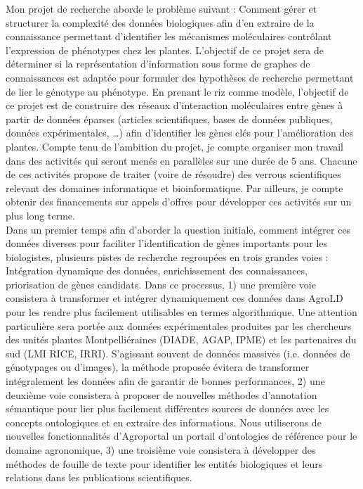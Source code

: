 Mon projet de recherche aborde le problème suivant : Comment gérer et structurer la complexité des données biologiques afin d’en extraire de la connaissance permettant d’identifier les mécanismes moléculaires contrôlant l’expression de phénotypes chez les plantes. 
L’objectif de ce projet sera de déterminer si la représentation d’information sous forme de graphes de connaissances est adaptée pour formuler des hypothèses de recherche permettant de lier le génotype au phénotype. En prenant le riz comme modèle, l’objectif de ce projet est de construire des réseaux d’interaction moléculaires entre gènes à partir de données éparses (articles scientifiques, bases de données publiques, données expérimentales, …) afin d’identifier les gènes clés pour l’amélioration des plantes. Compte tenu de l’ambition du projet, je compte organiser mon travail dans des activités qui seront menés en parallèles sur une durée de 5 ans. Chacune de ces activités propose de traiter (voire de résoudre) des verrous scientifiques relevant des domaines informatique et bioinformatique. Par ailleurs, je compte obtenir des financements sur appels d’offres pour développer ces activités sur un plus long terme. \\

Dans un premier temps afin d'aborder la question initiale, comment intégrer ces données diverses pour faciliter l’identification de gènes importants pour les biologistes,  plusieurs pistes de recherche regroupées en trois grandes voies : Intégration dynamique des données, enrichissement des connaissances, priorisation de gènes candidats. Dans ce processus, 1) une première voie consistera à transformer et intégrer dynamiquement ces données dans AgroLD pour les rendre plus facilement utilisables en termes algorithmique. Une attention particulière sera portée aux données expérimentales produites par les chercheurs des unités plantes Montpelliéraines (DIADE, AGAP, IPME) et les partenaires du sud (LMI RICE, IRRI). S’agissant souvent de données massives (i.e. données de génotypages ou d’images), la méthode proposée évitera de transformer intégralement les données afin de garantir de bonnes performances, 2) une deuxième voie consistera à proposer de nouvelles méthodes d’annotation sémantique pour lier plus facilement différentes sources de données avec les concepts ontologiques et en extraire des informations. Nous utiliserons de nouvelles fonctionnalités d’Agroportal un portail d'ontologies de référence pour le domaine agronomique,  3) une troisième voie consistera à développer des méthodes de fouille de texte pour identifier les entités biologiques et leurs relations dans les publications scientifiques.\\


